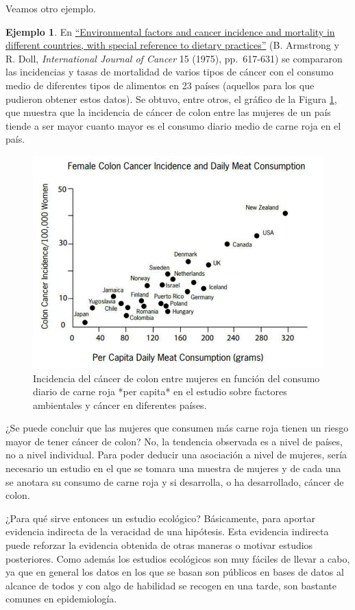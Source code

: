 \documentclass[
]{book}
\theoremstyle{definition}
\theoremstyle{definition}
\newtheorem{example}{Ejemplo}[chapter]
\theoremstyle{definition}
\theoremstyle{definition}
\theoremstyle{remark}
\begin{document}
Veamos otro ejemplo.

\begin{example}
\protect\hypertarget{exm:colombiaBC}{}\label{exm:colombiaBC}En \href{https://onlinelibrary.wiley.com/doi/abs/10.1002/ijc.2910150411}{``Environmental factors and cancer incidence and mortality in different countries, with special reference to dietary practices''} (B. Armstrong y R. Doll, \emph{International Journal of Cancer} 15 (1975), pp.~617-631) se compararon las incidencias y tasas de mortalidad de varios tipos de cáncer con el consumo medio de diferentes tipos de alimentos en 23 países (aquellos para los que pudieron obtener estos datos). Se obtuvo, entre otros, el gráfico de la Figura \ref{fig:cccr}, que muestra que la incidencia de cáncer de colon entre las mujeres de un país tiende a ser mayor cuanto mayor es el consumo diario medio de carne roja en el país.
\end{example}

\begin{figure}

{\centering \includegraphics[width=0.6\linewidth]{INREMDN_files/figure-html/meat} 

}

\caption{Incidencia del cáncer de colon entre mujeres en función del consumo diario de carne roja *per capita* en  el estudio sobre factores ambientales y cáncer en diferentes países.}\label{fig:cccr}
\end{figure}

¿Se puede concluir que las mujeres que consumen más carne roja tienen un riesgo mayor de tener cáncer de colon? No, la tendencia observada es a nivel de países, no a nivel individual. Para poder deducir una asociación a nivel de mujeres, sería necesario un estudio en el que se tomara una muestra de mujeres y de cada una se anotara su consumo de carne roja y si desarrolla, o ha desarrollado, cáncer de colon.

¿Para qué sirve entonces un estudio ecológico? Básicamente, para aportar evidencia indirecta de la veracidad de una hipótesis. Esta evidencia indirecta puede reforzar la evidencia obtenida de otras maneras o motivar estudios posteriores. Como además los estudios ecológicos son muy fáciles de llevar a cabo, ya que en general los datos en los que se basan son públicos en bases de datos al alcance de todos y con algo de habilidad se recogen en una tarde, son bastante comunes en epidemiología.
\end{document}
